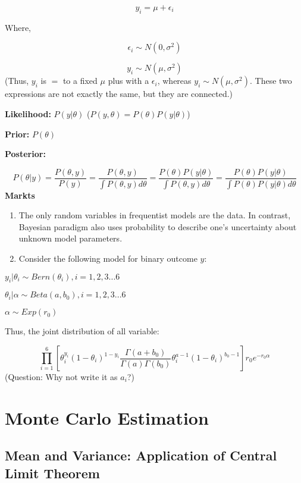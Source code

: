 \documentclass[]{book}
\begin{document}
\[y_i=\mu+\epsilon_i\]

Where,

\[\epsilon_i \sim N(0, \sigma^2)\]

\[y_i \sim N(\mu, \sigma^2)\] (Thus, \(y_i\) is \(=\) to a fixed \(\mu\)
plus with a \(\epsilon_i\), whereas \(y_i \sim N(\mu, \sigma^2)\). These
two expressions are not exactly the same, but they are connected.)

\textbf{Likelihood:} \(P(y|\theta)\)
(\(P(y,\theta)=P(\theta)P(y|\theta)\))

\textbf{Prior:} \(P(\theta)\)

\textbf{Posterior:}

\[P(\theta|y)=\frac{P(\theta, y)}{P(y)}=\frac{P(\theta, y)}{\int P(\theta, y)d\theta}=\frac{P(\theta)P(y|\theta)}{\int P(\theta, y)d\theta}=\frac{P(\theta)P(y|\theta)}{\int P(\theta)P(y|\theta)d\theta}\]
\textbf{Markts}

\begin{enumerate}
\def\labelenumi{(\arabic{enumi})}
\item
  The only random variables in frequentist models are the data. In
  contrast, Bayesian paradigm also uses probability to describe one's
  uncertainty about unknown model parameters.
\item
  Consider the following model for binary outcome \(y\):
\end{enumerate}

\(y_i|\theta_i \sim Bern (\theta_i), i=1,2,3...6\)

\(\theta_i |\alpha \sim Beta(a, b_0), i=1,2,3...6\)

\(\alpha \sim Exp(r_0)\)

Thus, the joint distribution of all variable:

\[\prod_{i=1}^{6}[\theta_i^{y_i}(1-\theta_i)^{1-y_i}\frac{\Gamma(a+b_0)}{\Gamma(a)\Gamma(b_0)}\theta_i^{a-1}(1-\theta_i)^{b_0-1}]r_0e^{-r_0 \alpha}\]
(Question: Why not write it as \(a_i\)?)

\section{Monte Carlo Estimation}\label{monte-carlo-estimation}

\subsection{Mean and Variance: Application of Central Limit
Theorem}\label{mean-and-variance-application-of-central-limit-theorem}
\end{document}
